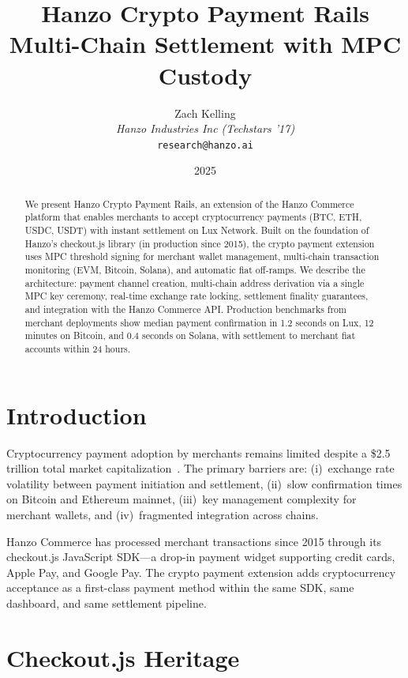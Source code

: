 \documentclass[11pt]{article}
\title{Hanzo Crypto Payment Rails\\[0.3em]
{\large Multi-Chain Settlement with MPC Custody}}
\author{
    Zach Kelling \\
    \textit{Hanzo Industries Inc (Techstars '17)} \\
    \texttt{research@hanzo.ai}
}
\date{2025}
\begin{document}
\hanzocoverpage

\begin{abstract}
We present Hanzo Crypto Payment Rails, an extension of the Hanzo Commerce
platform that enables merchants to accept cryptocurrency payments (BTC,
ETH, USDC, USDT) with instant settlement on Lux Network. Built on the
foundation of Hanzo's checkout.js library (in production since 2015),
the crypto payment extension uses MPC threshold signing for merchant
wallet management, multi-chain transaction monitoring (EVM, Bitcoin,
Solana), and automatic fiat off-ramps. We describe the architecture:
payment channel creation, multi-chain address derivation via a single MPC
key ceremony, real-time exchange rate locking, settlement finality
guarantees, and integration with the Hanzo Commerce API. Production
benchmarks from merchant deployments show median payment confirmation in
1.2 seconds on Lux, 12 minutes on Bitcoin, and 0.4 seconds on Solana,
with settlement to merchant fiat accounts within 24 hours.
\end{abstract}

\section{Introduction}
\label{sec:intro}

Cryptocurrency payment adoption by merchants remains limited despite a
\$2.5 trillion total market capitalization~\cite{coinmarket2024}. The
primary barriers are: (i)~exchange rate volatility between payment
initiation and settlement, (ii)~slow confirmation times on Bitcoin and
Ethereum mainnet, (iii)~key management complexity for merchant wallets,
and (iv)~fragmented integration across chains.

Hanzo Commerce has processed merchant transactions since 2015 through
its checkout.js JavaScript SDK---a drop-in payment widget supporting
credit cards, Apple Pay, and Google Pay. The crypto payment extension
adds cryptocurrency acceptance as a first-class payment method within
the same SDK, same dashboard, and same settlement pipeline.

\section{Checkout.js Heritage}
\label{sec:checkout}
\end{document}
